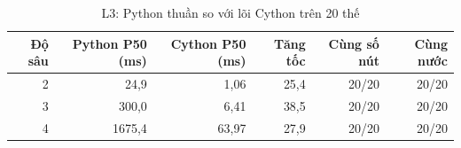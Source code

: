 \begin{table}[H]
  \centering
  \small
  \caption{L3: Python thuần so với lõi Cython trên 20 thế}
  \label{tab:cs-tk-backend-ab}
  \begin{tabular}{rrrrrr}
    \toprule
    Độ sâu & Python P50 (ms) & Cython P50 (ms) & Tăng tốc & Cùng số nút & Cùng nước \\
    \midrule
    2 & 24,9 & 1,06 & 25,4 & 20/20 & 20/20 \\
    3 & 300,0 & 6,41 & 38,5 & 20/20 & 20/20 \\
    4 & 1675,4 & 63,97 & 27,9 & 20/20 & 20/20 \\
    \bottomrule
  \end{tabular}
\end{table}
